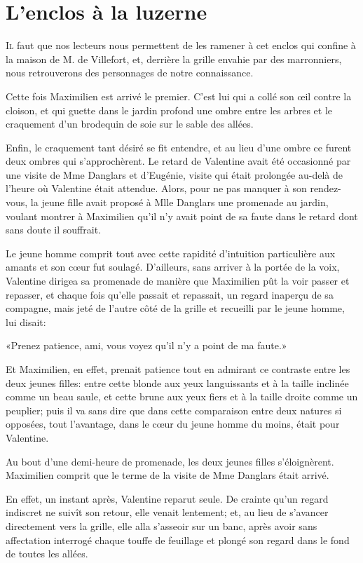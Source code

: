 \chapter{L'enclos à la luzerne}

\lettrine{I}{l} faut que nos lecteurs nous permettent de les ramener à cet enclos qui confine à la maison de M. de Villefort, et, derrière la grille envahie par des marronniers, nous retrouverons des personnages de notre connaissance. 

Cette fois Maximilien est arrivé le premier. C'est lui qui a collé son œil contre la cloison, et qui guette dans le jardin profond une ombre entre les arbres et le craquement d'un brodequin de soie sur le sable des allées. 

Enfin, le craquement tant désiré se fit entendre, et au lieu d'une ombre ce furent deux ombres qui s'approchèrent. Le retard de Valentine avait été occasionné par une visite de Mme Danglars et d'Eugénie, visite qui était prolongée au-delà de l'heure où Valentine était attendue. Alors, pour ne pas manquer à son rendez-vous, la jeune fille avait proposé à Mlle Danglars une promenade au jardin, voulant montrer à Maximilien qu'il n'y avait point de sa faute dans le retard dont sans doute il souffrait. 

Le jeune homme comprit tout avec cette rapidité d'intuition particulière aux amants et son cœur fut soulagé. D'ailleurs, sans arriver à la portée de la voix, Valentine dirigea sa promenade de manière que Maximilien pût la voir passer et repasser, et chaque fois qu'elle passait et repassait, un regard inaperçu de sa compagne, mais jeté de l'autre côté de la grille et recueilli par le jeune homme, lui disait: 

«Prenez patience, ami, vous voyez qu'il n'y a point de ma faute.» 

Et Maximilien, en effet, prenait patience tout en admirant ce contraste entre les deux jeunes filles: entre cette blonde aux yeux languissants et à la taille inclinée comme un beau saule, et cette brune aux yeux fiers et à la taille droite comme un peuplier; puis il va sans dire que dans cette comparaison entre deux natures si opposées, tout l'avantage, dans le cœur du jeune homme du moins, était pour Valentine.  

Au bout d'une demi-heure de promenade, les deux jeunes filles s'éloignèrent. Maximilien comprit que le terme de la visite de Mme Danglars était arrivé. 

En effet, un instant après, Valentine reparut seule. De crainte qu'un regard indiscret ne suivît son retour, elle venait lentement; et, au lieu de s'avancer directement vers la grille, elle alla s'asseoir sur un banc, après avoir sans affectation interrogé chaque touffe de feuillage et plongé son regard dans le fond de toutes les allées. 

